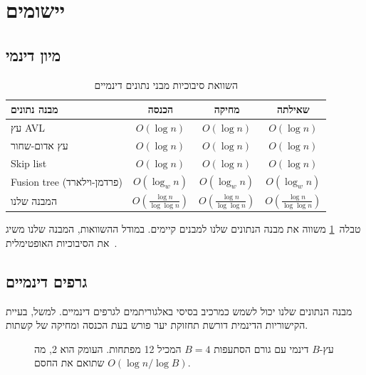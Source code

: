 \documentclass[12pt,a4paper]{article}
\theoremstyle{plain}
\theoremstyle{definition}
\theoremstyle{remark}
\begin{document}
\section{יישומים}
\label{sec:apps}

\subsection{מיון דינמי}

\begin{table}[ht]
\centering
\caption{השוואת סיבוכיות מבני נתונים דינמיים}
\label{tab:comparison}
\begin{tabular}{lccc}
\toprule
מבנה נתונים & הכנסה & מחיקה & שאילתה \\
\midrule
עץ AVL & $O(\log n)$ & $O(\log n)$ & $O(\log n)$ \\
עץ אדום-שחור & $O(\log n)$ & $O(\log n)$ & $O(\log n)$ \\
Skip list & $O(\log n)$ & $O(\log n)$ & $O(\log n)$ \\
Fusion tree (פרדמן-וילארד) & $O(\log_w n)$ & $O(\log_w n)$ & $O(\log_w n)$ \\
המבנה שלנו & $O\!\left(\frac{\log n}{\log \log n}\right)$ & $O\!\left(\frac{\log n}{\log \log n}\right)$ & $O\!\left(\frac{\log n}{\log \log n}\right)$ \\
\bottomrule
\end{tabular}
\end{table}

טבלה~\ref{tab:comparison} משווה את מבנה הנתונים שלנו למבנים
קיימים. במודל ההשוואות, המבנה שלנו משיג את הסיבוכיות
האופטימלית~\citep{patrascu2008}.

\subsection{גרפים דינמיים}

מבנה הנתונים שלנו יכול לשמש כמרכיב בסיסי באלגוריתמים
לגרפים דינמיים. למשל, בעיית הקישוריות הדינמית דורשת
תחזוקת יער פורש בעת הכנסה ומחיקה של קשתות.

\begin{figure}[ht]
\centering
{}
\caption{עץ-$B$ דינמי עם גורם הסתעפות $B = 4$ המכיל 12 מפתחות.
העומק הוא 2, מה שתואם את החסם $O(\log n / \log B)$.}
\label{fig:btree}
\end{figure}
\end{document}
